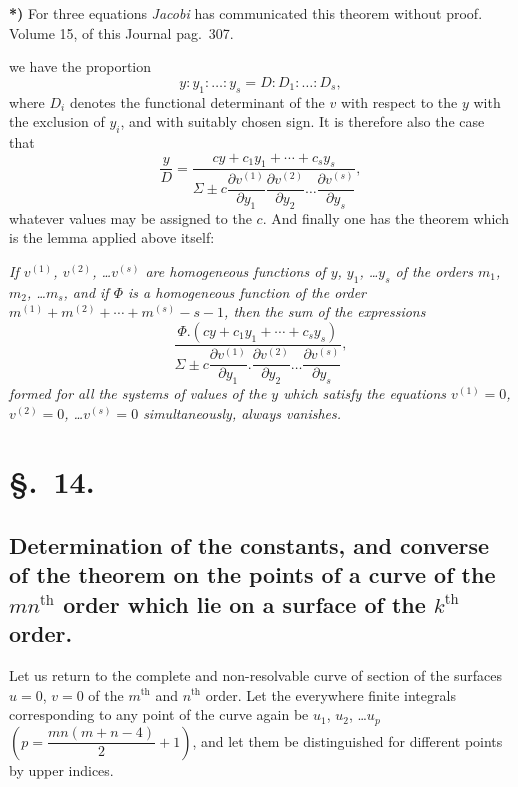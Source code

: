 \documentclass{article}
\begin{document}
\textbf{*)} For three equations \emph{Jacobi} has communicated this theorem without proof. Volume 15, of this Journal pag.\ 307.

we have the proportion
\[
y:y_{1}:\ldots:y_{s} = D:D_{1}:\ldots:D_{s},
\]
where $D_{i}$ denotes the functional determinant of the $v$ with respect to the $y$ with the exclusion of $y_{i}$, and with suitably chosen sign. It is therefore also the case that
\[
\frac{y}{D} = \frac{cy+c_{1}y_{1}+\cdots+c_{s}y_{s}}{\Sigma\pm c\dfrac{\partial v^{(1)}}{\partial y_{1}}\dfrac{\partial v^{(2)}}{\partial y_{2}}\ldots\dfrac{\partial v^{(s)}}{\partial y_{s}}},
\]
whatever values may be assigned to the $c$. And finally one has the theorem which is the lemma applied above itself:

\emph{If $v^{(1)}$, $v^{(2)}$, \ldots $v^{(s)}$ are homogeneous functions of $y$, $y_{1}$, \ldots $y_{s}$ of the orders $m_{1}$, $m_{2}$, \ldots $m_{s}$, and if $\Phi$ is a homogeneous function of the order $m^{(1)}+m^{(2)}+\cdots+m^{(s)}-s-1$, then the sum of the expressions}
\[
\frac{\Phi.(cy+c_{1}y_{1}+\cdots+c_{s}y_{s})}{\Sigma\pm c\dfrac{\partial v^{(1)}}{\partial y_{1}}.\dfrac{\partial v^{(2)}}{\partial y_{2}}\ldots\dfrac{\partial v^{(s)}}{\partial y_{s}}},
\]
\emph{formed for all the systems of values of the $y$ which satisfy the equations $v^{(1)}=0$, $v^{(2)}=0$, \ldots $v^{(s)}=0$ simultaneously, always vanishes.}

\section*{§.~14.}

\subsection*{Determination of the constants, and converse of the theorem on the points of a curve of the $mn^{\text{th}}$ order which lie on a surface of the $k^{\text{th}}$ order.}

Let us return to the complete and non-resolvable curve of section of the surfaces $u=0$, $v=0$ of the $m^{\text{th}}$ and $n^{\text{th}}$ order. Let the everywhere finite integrals corresponding to any point of the curve again be $u_{1}$, $u_{2}$, \ldots $u_{p}$ $\left(p=\dfrac{mn(m+n-4)}{2}+1\right)$, and let them be distinguished for different points by upper indices.
\end{document}
